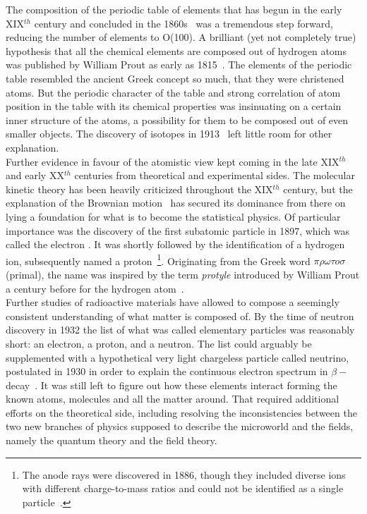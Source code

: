The composition of the periodic table of elements that has begun in the early XIX$^{th}$ century and concluded in the 1860s~\cite{mendel} was a tremendous step forward, reducing the number of elements to O(100). A brilliant (yet not completely true) hypothesis that all the chemical elements are composed out of hydrogen atoms was published by William Prout as early as 1815~\cite{prout}. The elements of the periodic table resembled the ancient Greek concept so much, that they were christened atoms. But the periodic character of the table and strong correlation of atom position in the table with its chemical properties was insinuating on a certain inner structure of the atoms, a possibility for them to be composed out of even smaller objects. The discovery of isotopes in 1913~\cite{isotopes} left little room for other explanation.\\
Further evidence in favour of the atomistic view kept coming in the late XIX$^{th}$ and early XX$^{th}$ centuries from theoretical and experimental sides. The molecular kinetic theory has been heavily criticized throughout the XIX$^{th}$ century, but the explanation of the Brownian motion~\cite{brownian} has secured its dominance from there on lying a foundation for what is to become the statistical physics. Of particular importance was the discovery of the first subatomic particle in 1897, which was called the electron \cite{cathode}. It was shortly followed by the identification of a hydrogen ion, subsequently named a proton~\cite{proton_discovery}\footnote{The anode rays were discovered in 1886, though they included diverse ions with different charge-to-mass ratios and could not be identified as a single particle~\cite{anode_rays}.}. Originating from the Greek word $\pi \rho \omega \tau o \sigma$ (primal), the name was inspired by the term \textit{protyle} introduced by William Prout a century before for the hydrogen atom~\cite{prout}.\\
Further studies of radioactive materials have allowed to compose a seemingly consistent understanding of what matter is composed of. By the time of neutron discovery in 1932 \cite{neutron} the list of what was called elementary particles was reasonably short: an electron, a proton, and a neutron. The list could arguably be supplemented with a hypothetical very light chargeless particle called neutrino, postulated in 1930 in order to explain the continuous electron spectrum in $\beta-$decay~\cite{pauli_neutrino}. It was still left to figure out how these elements interact forming the known atoms, molecules and all the matter around. That required additional efforts on the theoretical side, including resolving the inconsistencies between the two new branches of physics supposed to describe the microworld and the fields, namely the quantum theory and the field theory. \\
